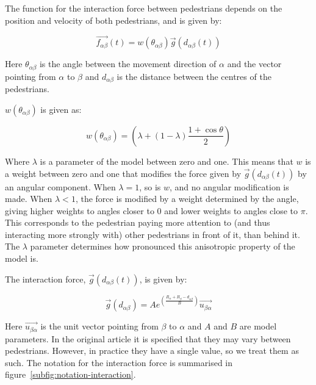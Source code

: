 The function for the interaction force between pedestrians depends on the 
position and velocity of both pedestrians, and is given by:

\begin{equation}
    \overrightarrow{f_{\alpha \beta }}(t) = 
    w\left(\theta_{\alpha \beta}\right)
    \overrightarrow{g}\left(d_{\alpha \beta}(t)\right)
    \label{eq:pedestrianinteraction}
\end{equation}

Here $\theta_{\alpha \beta}$ is the angle between the movement direction of 
$\alpha$ and the vector pointing from $\alpha$ to $\beta$ and $d_{\alpha 
\beta}$ is the distance between the centres of the pedestrians. 

$ w(\theta_{\alpha \beta})$ is given as: 

\begin{equation}
    w\left(\theta_{\alpha \beta}\right)=
    \left(
        \lambda + \left(
            1 - \lambda
        \right)
		\frac{1+\cos{\theta}}{2}
    \right) 
    \label{angleAB}
\end{equation}

Where $\lambda$ is a parameter of the model between zero and one. This means 
that $w$ is a weight between zero and one that modifies the force given by 
$\overrightarrow{g}\left(d_{\alpha \beta}(t)\right)$ by an angular component.  
When $\lambda=1$, so is $w$, and no angular modification is made. When 
$\lambda<1$, the force is modified by a weight determined by the angle, giving 
higher weights to angles closer to $0$ and lower weights to angles close to 
$\pi$. This corresponds to the pedestrian paying more attention to (and thus 
interacting more strongly with) other pedestrians in front of it, than behind 
it. The $\lambda$ parameter determines how pronounced this anisotropic 
property of the model is.


The interaction force, $\overrightarrow{g}\left(d_{\alpha \beta} (t)\right)$, is 
given by:  

\begin{equation}
    \overrightarrow{g} 
    \left(
        d_{\alpha \beta}
    \right)
    =
    A e^{ \left(
        \frac{ R_\alpha + R_\beta - d_{\alpha \beta}}
             {B}
    \right)}
    \overrightarrow{u_{\beta \alpha}}
    \label{re}	
\end{equation}

Here $\overrightarrow{u_{\beta \alpha}}$ is the unit vector pointing from 
$\beta$ to $\alpha$ and $A$ and $B$ are model parameters. In the original 
article it is specified that they may vary between pedestrians. However, in 
practice they have a single value, so we treat them as such. The notation for 
the interaction force is summarised in 
figure~\ref{subfig:notation-interaction}.

